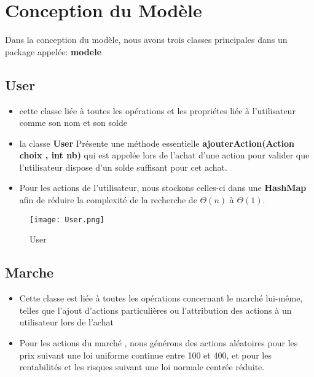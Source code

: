 \documentclass[10pt]{article}
\begin{document}
\newpage
\section{\textbf{Conception du Modèle}}


Dans la conception du modèle, nous avons trois classes principales dans un package appelée: \textbf{modele}

\subsection{User}

\begin{itemize}
    \item  cette classe liée à toutes les opérations et les propriétes liée à l'utilisateur comme son nom et son solde

    \item  la classe \textbf{User} Présente une méthode essentielle
    \newline
    \textbf{ajouterAction(Action choix , int nb)} qui  est appelée lors de l'achat d'une action pour valider que l'utilisateur dispose d'un solde suffisant pour cet achat.
    
    \item  Pour  les actions de l'utilisateur, nous stockons celles-ci dans une \textbf{HashMap} afin de réduire la complexité de la recherche de \textbf{$\Theta(n)$} à \textbf{$\Theta(1)$}.

\end{itemize}

\begin{figure}
    \centering
    \texttt{[image: User.png]}
    \caption{User}
    \label{fig:enter-label}
\end{figure}


\subsection{Marche}

\begin{itemize}
    \item Cette classe est liée à toutes les opérations concernant le marché lui-même, telles que l'ajout d'actions particulières ou l'attribution des actions à un utilisateur lors de l'achat
    
    \item Pour les actions du marché , nous générons des actions aléatoires pour les prix suivant une loi uniforme continue entre 100 et 400, et pour les rentabilités et les risques suivant une loi normale centrée réduite.

\end{itemize}
\end{document}
